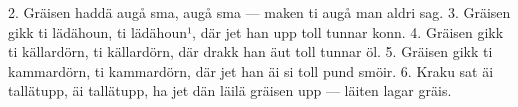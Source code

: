 2.  Gräisen haddä augå sma, augå sma —
    maken ti augå man aldri sag.
3.  Gräisen gikk ti lädähoun, ti lädähoun¹,
    där jet han upp toll tunnar konn.
4.  Gräisen gikk ti källardörn, ti källardörn,
    där drakk han äut toll tunnar öl.
5.  Gräisen gikk ti kammardörn, ti kammardörn,
    där jet han äi si toll pund smöir.
6.  Kraku sat äi tallätupp, äi tallätupp,
    ha jet dän läilä gräisen upp —
    \qquad{}läiten lagar gräis.
